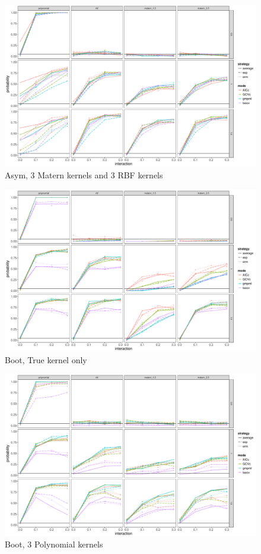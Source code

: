 \documentclass[11pt]{article}
\begin{document}
\begin{figure}
\begin{center}
\includegraphics[width=0.9\columnwidth]{A5} 
\caption{Asym, 3 Matern kernels and 3 RBF kernels}
\label{fig:res}
\end{center}
\end{figure}

\begin{figure}
\begin{center}
\includegraphics[width=0.9\columnwidth]{B1} 
\caption{Boot, True kernel only}
\label{fig:res}
\end{center}
\end{figure}

\begin{figure}
\begin{center}
\includegraphics[width=0.9\columnwidth]{B2} 
\caption{Boot, 3 Polynomial kernels}
\label{fig:res}
\end{center}
\end{figure}
\end{document}

